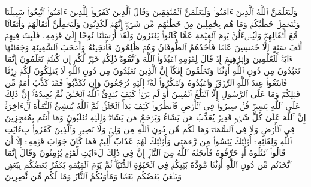 \startbuffer[\q:29:11]
وَلَیَعۡلَمَنَّ ٱللَّهُ ٱلَّذِینَ ءَامَنُوا۟ وَلَیَعۡلَمَنَّ ٱلۡمُنَٰفِقِینَ%
\stopbuffer
\startbuffer[\q:29:12]
وَقَالَ ٱلَّذِینَ كَفَرُوا۟ لِلَّذِینَ ءَامَنُوا۟ ٱتَّبِعُوا۟ سَبِیلَنَا وَلۡنَحۡمِلۡ خَطَٰیَٰكُمۡ وَمَا هُم بِحَٰمِلِینَ مِنۡ خَطَٰیَٰهُم مِّن شَیۡءٍۖ إِنَّهُمۡ لَكَٰذِبُونَ%
\stopbuffer
\startbuffer[\q:29:13]
وَلَیَحۡمِلُنَّ أَثۡقَالَهُمۡ وَأَثۡقَالࣰا مَّعَ أَثۡقَالِهِمۡۖ وَلَیُسۡءَلُنَّ یَوۡمَ ٱلۡقِیَٰمَةِ عَمَّا كَانُوا۟ یَفۡتَرُونَ%
\stopbuffer
\startbuffer[\q:29:14]
وَلَقَدۡ أَرۡسَلۡنَا نُوحًا إِلَىٰ قَوۡمِهِۦ فَلَبِثَ فِیهِمۡ أَلۡفَ سَنَةٍ إِلَّا خَمۡسِینَ عَامࣰا فَأَخَذَهُمُ ٱلطُّوفَانُ وَهُمۡ ظَٰلِمُونَ%
\stopbuffer
\startbuffer[\q:29:15]
فَأَنجَیۡنَٰهُ وَأَصۡحَٰبَ ٱلسَّفِینَةِ وَجَعَلۡنَٰهَاۤ ءَایَةࣰ لِّلۡعَٰلَمِینَ%
\stopbuffer
\startbuffer[\q:29:16]
وَإِبۡرَٰهِیمَ إِذۡ قَالَ لِقَوۡمِهِ ٱعۡبُدُوا۟ ٱللَّهَ وَٱتَّقُوهُۖ ذَٰلِكُمۡ خَیۡرࣱ لَّكُمۡ إِن كُنتُمۡ تَعۡلَمُونَ%
\stopbuffer
\startbuffer[\q:29:17]
إِنَّمَا تَعۡبُدُونَ مِن دُونِ ٱللَّهِ أَوۡثَٰنࣰا وَتَخۡلُقُونَ إِفۡكًاۚ إِنَّ ٱلَّذِینَ تَعۡبُدُونَ مِن دُونِ ٱللَّهِ لَا یَمۡلِكُونَ لَكُمۡ رِزۡقࣰا فَٱبۡتَغُوا۟ عِندَ ٱللَّهِ ٱلرِّزۡقَ وَٱعۡبُدُوهُ وَٱشۡكُرُوا۟ لَهُۥۤۖ إِلَیۡهِ تُرۡجَعُونَ%
\stopbuffer
\startbuffer[\q:29:18]
وَإِن تُكَذِّبُوا۟ فَقَدۡ كَذَّبَ أُمَمࣱ مِّن قَبۡلِكُمۡۖ وَمَا عَلَى ٱلرَّسُولِ إِلَّا ٱلۡبَلَٰغُ ٱلۡمُبِینُ%
\stopbuffer
\startbuffer[\q:29:19]
أَوَ لَمۡ یَرَوۡا۟ كَیۡفَ یُبۡدِئُ ٱللَّهُ ٱلۡخَلۡقَ ثُمَّ یُعِیدُهُۥۤۚ إِنَّ ذَٰلِكَ عَلَى ٱللَّهِ یَسِیرࣱ%
\stopbuffer
\startbuffer[\q:29:20]
قُلۡ سِیرُوا۟ فِی ٱلۡأَرۡضِ فَٱنظُرُوا۟ كَیۡفَ بَدَأَ ٱلۡخَلۡقَۚ ثُمَّ ٱللَّهُ یُنشِئُ ٱلنَّشۡأَةَ ٱلۡءَاخِرَةَۚ إِنَّ ٱللَّهَ عَلَىٰ كُلِّ شَیۡءࣲ قَدِیرࣱ%
\stopbuffer
\startbuffer[\q:29:21]
یُعَذِّبُ مَن یَشَاۤءُ وَیَرۡحَمُ مَن یَشَاۤءُۖ وَإِلَیۡهِ تُقۡلَبُونَ%
\stopbuffer
\startbuffer[\q:29:22]
وَمَاۤ أَنتُم بِمُعۡجِزِینَ فِی ٱلۡأَرۡضِ وَلَا فِی ٱلسَّمَاۤءِۖ وَمَا لَكُم مِّن دُونِ ٱللَّهِ مِن وَلِیࣲّ وَلَا نَصِیرࣲ%
\stopbuffer
\startbuffer[\q:29:23]
وَٱلَّذِینَ كَفَرُوا۟ بِءَایَٰتِ ٱللَّهِ وَلِقَاۤئِهِۦۤ أُو۟لَٰۤئِكَ یَئِسُوا۟ مِن رَّحۡمَتِی وَأُو۟لَٰۤئِكَ لَهُمۡ عَذَابٌ أَلِیمࣱ%
\stopbuffer
\startbuffer[\q:29:24]
فَمَا كَانَ جَوَابَ قَوۡمِهِۦۤ إِلَّاۤ أَن قَالُوا۟ ٱقۡتُلُوهُ أَوۡ حَرِّقُوهُ فَأَنجَىٰهُ ٱللَّهُ مِنَ ٱلنَّارِۚ إِنَّ فِی ذَٰلِكَ لَءَایَٰتࣲ لِّقَوۡمࣲ یُؤۡمِنُونَ%
\stopbuffer
\startbuffer[\q:29:25]
وَقَالَ إِنَّمَا ٱتَّخَذۡتُم مِّن دُونِ ٱللَّهِ أَوۡثَٰنࣰا مَّوَدَّةَ بَیۡنِكُمۡ فِی ٱلۡحَیَوٰةِ ٱلدُّنۡیَاۖ ثُمَّ یَوۡمَ ٱلۡقِیَٰمَةِ یَكۡفُرُ بَعۡضُكُم بِبَعۡضࣲ وَیَلۡعَنُ بَعۡضُكُم بَعۡضࣰا وَمَأۡوَىٰكُمُ ٱلنَّارُ وَمَا لَكُم مِّن نَّٰصِرِینَ%
\stopbuffer
